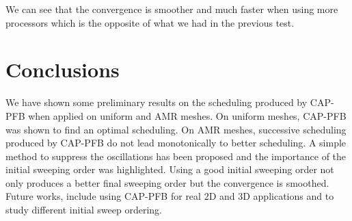 \documentclass[letterpaper]{article}
\renewcommand{\(}{\left(}
\renewcommand{\)}{\right)}
\renewcommand{\[}{\left[}
\renewcommand{\]}{\right]}
\begin{document}
We can see that the convergence is smoother and much faster when using more
processors which is the opposite of what we had in the previous test. 

\section{Conclusions} \label{conclusions}
We have shown some preliminary results on the scheduling produced by CAP-PFB
when applied on uniform and AMR meshes. On uniform meshes, CAP-PFB was shown to
find an optimal scheduling. On AMR meshes, successive scheduling produced by
CAP-PFB do not lead monotonically to better scheduling. A simple method to
suppress the oscillations has been proposed and the importance of the initial
sweeping order was highlighted. Using a good initial sweeping order not only
produces a better final sweeping order but the convergence is smoothed. Future
works, include using CAP-PFB for real 2D and 3D applications and to study
different initial sweep ordering.




\end{document}
